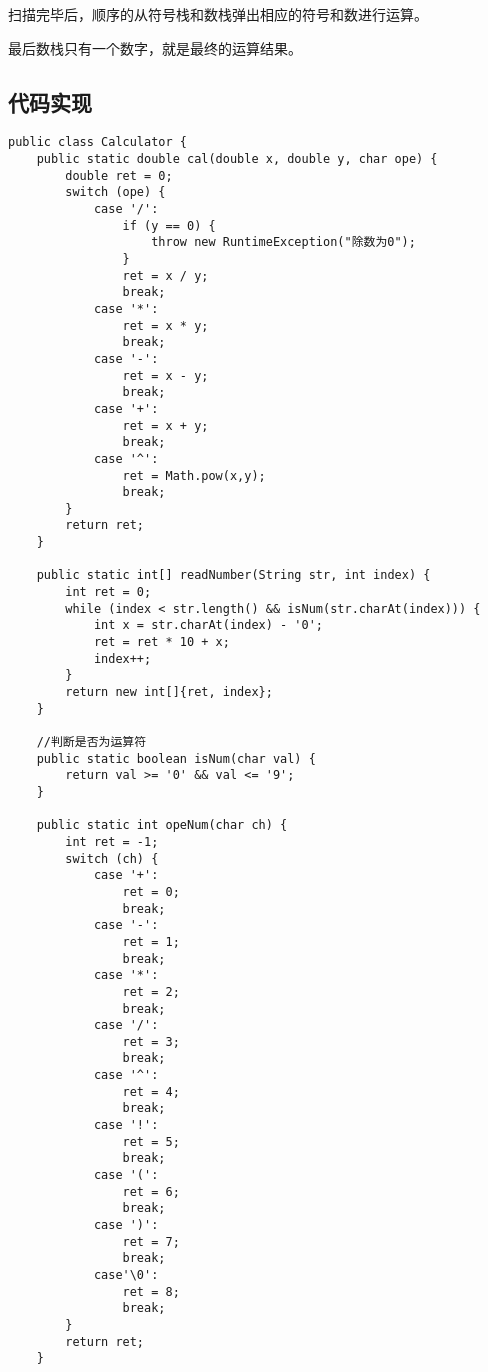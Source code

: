 \documentclass[a4paper]{report}
\begin{document}
扫描完毕后，顺序的从符号栈和数栈弹出相应的符号和数进行运算。

最后数栈只有一个数字，就是最终的运算结果。

\subsection{代码实现}
\begin{lstlisting}
public class Calculator {
    public static double cal(double x, double y, char ope) {
        double ret = 0;
        switch (ope) {
            case '/':
                if (y == 0) {
                    throw new RuntimeException("除数为0");
                }
                ret = x / y;
                break;
            case '*':
                ret = x * y;
                break;
            case '-':
                ret = x - y;
                break;
            case '+':
                ret = x + y;
                break;
            case '^':
                ret = Math.pow(x,y);
                break;
        }
        return ret;
    }

    public static int[] readNumber(String str, int index) {
        int ret = 0;
        while (index < str.length() && isNum(str.charAt(index))) {
            int x = str.charAt(index) - '0';
            ret = ret * 10 + x;
            index++;
        }
        return new int[]{ret, index};
    }

    //判断是否为运算符
    public static boolean isNum(char val) {
        return val >= '0' && val <= '9';
    }

    public static int opeNum(char ch) {
        int ret = -1;
        switch (ch) {
            case '+':
                ret = 0;
                break;
            case '-':
                ret = 1;
                break;
            case '*':
                ret = 2;
                break;
            case '/':
                ret = 3;
                break;
            case '^':
                ret = 4;
                break;
            case '!':
                ret = 5;
                break;
            case '(':
                ret = 6;
                break;
            case ')':
                ret = 7;
                break;
            case'\0':
                ret = 8;
                break;
        }
        return ret;
    }


\end{lstlisting}
\end{document}

